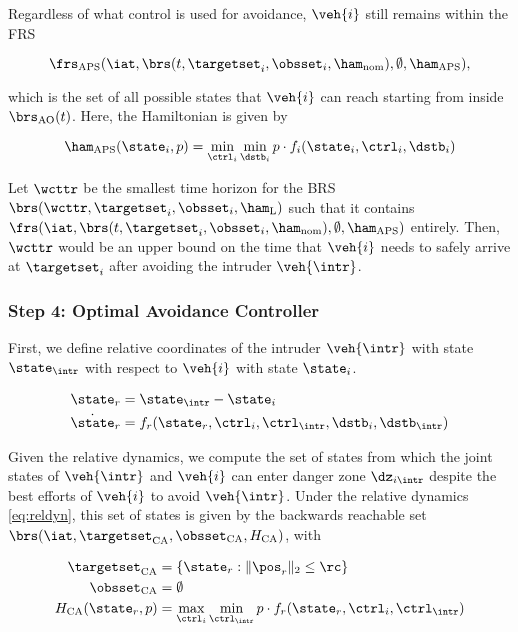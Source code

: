 Regardless of what control is used for avoidance, $\veh{i}$ still remains within the FRS 

\begin{equation}
\frs_\text{APS}(\iat, \brs(t, \targetset_i, \obsset_i, \ham_\text{nom}), \emptyset, \ham_\text{APS}), 
\end{equation}

\noindent which is the set of all possible states that $\veh{i}$ can reach starting from inside $\brs_\text{AO}(t)$. Here, the Hamiltonian is given by

\begin{equation}
\ham_\text{APS}(\state_i, p) = \min_{\ctrl_i} \min_{\dstb_i} p \cdot f_i (\state_i, \ctrl_i, \dstb_i)
\end{equation}

Let $\wcttr$ be the smallest time horizon for the BRS $\brs(\wcttr, \targetset_i, \obsset_i, \ham_\text{L})$ such that it contains $\frs(\iat, \brs(t, \targetset_i, \obsset_i, \ham_\text{nom}), \emptyset, \ham_\text{APS})$ entirely. Then, $\wcttr$ would be an upper bound on the time that $\veh{i}$ needs to safely arrive at $\targetset_i$ after avoiding the intruder $\veh{\intr}$.

\subsubsection{Step 4: Optimal Avoidance Controller \label{sec:intruder_avoid}}
First, we define relative coordinates of the intruder $\veh{\intr}$ with state $\state_\intr$ with respect to $\veh{i}$ with state $\state_i$.

\begin{equation}
\label{eq:reldyn}
\begin{aligned}
\state_r &= \state_\intr - \state_i \\
\dot \state_r &= f_r(\state_r, \ctrl_i, \ctrl_\intr, \dstb_i, \dstb_\intr)
\end{aligned}
\end{equation}

Given the relative dynamics, we compute the set of states from which the joint states of $\veh{\intr}$ and $\veh{i}$ can enter danger zone $\dz_{i\intr}$ despite the best efforts of $\veh{i}$ to avoid $\veh{\intr}$. Under the relative dynamics \eqref{eq:reldyn}, this set of states is given by the backwards reachable set $\brs(\iat, \targetset_\text{CA}, \obsset_\text{CA}, H_\text{CA})$, with

\begin{equation}
\begin{aligned}
\targetset_\text{CA} &= \{\state_r: \|\pos_r\|_2 \le \rc\} \\
\obsset_\text{CA} &= \emptyset \\
H_\text{CA}(\state_r, p) &= \max_{\ctrl_i} \min_{\ctrl_\intr} p \cdot f_r(\state_r, \ctrl_i, \ctrl_\intr)
\end{aligned}
\end{equation}

